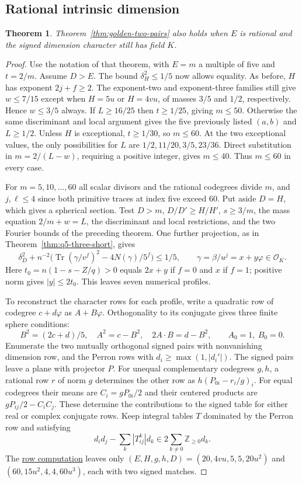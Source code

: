 \documentclass[11pt,reqno]{amsart}
\newcommand{\codecheck}[2]{\href{https://github.com/sebastienpalcoux/grothendieck-ring-classification/blob/d5750105bb5758f3ad38d2e5464dfcc12c019816/supplements/rank6/sphericality/#1}{#2}}
\newtheorem{theorem}{Theorem}[section]
\theoremstyle{remark}\newtheorem{remark}[theorem]{Remark}
\numberwithin{equation}{section}
\begin{document}
\subsection{Rational intrinsic dimension}
\begin{theorem}\label{thm:golden-two-rational-E}
Theorem~\ref{thm:golden-two-pairs} also holds when $E$ is rational and the signed dimension character still has field $K$.
\end{theorem}
\begin{proof}
Use the notation of that theorem, with $E=m$ a multiple of five and $t=2/m$. Assume $D>E$. The bound $\delta_H^2\le1/5$ now allows equality. As before, $H$ has exponent $2j+f\ge2$. The exponent-two and exponent-three families still give $w\le7/15$ except when $H=5u$ or $H=4vu$, of masses $3/5$ and $1/2$, respectively. Hence $w\le3/5$ always. If $L\ge16/25$ then $t\ge1/25$, giving $m\le50$. Otherwise the same discriminant and local argument gives the five previously listed $(a,b)$ and $L\ge1/2$. Unless $H$ is exceptional, $t\ge1/30$, so $m\le60$. At the two exceptional values, the only possibilities for $L$ are $1/2,11/20,3/5,23/36$. Direct substitution in $m=2/(L-w)$, requiring a positive integer, gives $m\le40$. Thus $m\le60$ in every case.

For $m=5,10,\ldots,60$ all scalar divisors and the rational codegrees
divide $m$, and $j,\ell\le4$ since both primitive traces at index
five exceed 60. Put aside $D=H$, which gives a spherical section. Test $D>m$,
$D/D'\ge H/H'$, $s\ge3/m$, the mass equation $2/m+w=L$,
the discriminant and local restrictions, and the two Fourier
bounds of the preceding theorem. One further projection, as in
Theorem~\ref{thm:q5-three-short}, gives
\[
 \delta_D^2+n^{-2}\bigl(\operatorname{Tr}(\gamma/v^f)^2
               -4N(\gamma)/5^f\bigr)\le1/5,\qquad
 \gamma=\beta/u^j=x+y\varphi\in\mathcal O_K .
\]
Here $t_0=n(1-s-Z/q)>0$ equals $2x+y$ if $f=0$ and $x$ if
$f=1$; positive norm gives $|y|\le2t_0$. This leaves seven
numerical profiles.

To reconstruct the character rows for each profile, write a
quadratic row of codegree $c+d\varphi$ as $A+B\varphi$.
Orthogonality to its conjugate gives three finite sphere conditions:
\[
 B^2=(2c+d)/5,\quad A^2=c-B^2,\quad 2A\cdot B=d-B^2,
 \qquad A_0=1,\ B_0=0 .
\]
Enumerate the two mutually orthogonal signed pairs with nonvanishing
dimension row, and the Perron rows with $d_i\ge\max(1,|d_i'|)$.
The signed pairs leave a plane with projector $P$. For unequal
complementary codegrees $g,h$, a rational row $r$ of norm $g$
determines the other row as $h(P_{0i}-r_i/g)_i$. For equal codegrees
their means are $C_i=gP_{0i}/2$ and their centered products are
$gP_{ij}/2-C_iC_j$. These determine the contributions to the signed
table for either real or complex conjugate rows.
Keep integral tables $T$ dominated by the Perron row and satisfying
\[
 d_i d_j-\sum_k|T_{ij}^k|d_k\in2\sum_{k\ne0}\mathbb Z_{\ge0}d_k .
\]
The \codecheck{golden_rational_two_check.py}{row computation} leaves
only $(E,H,g,h,D)=(20,4vu,5,5,20u^2)$ and
$(60,15u^2,4,4,60u^3)$, each with two signed matches.


\end{proof}
\end{document}

